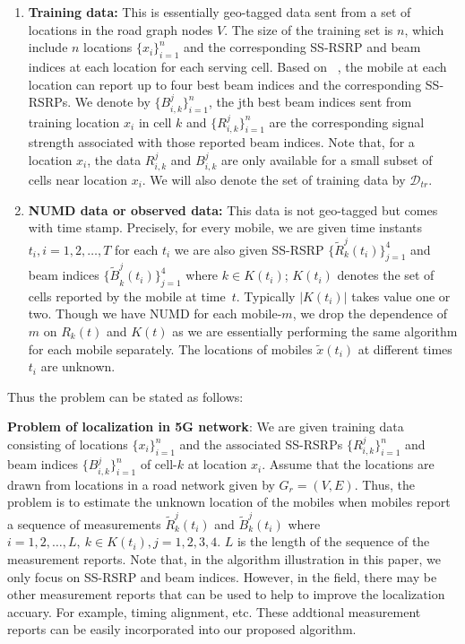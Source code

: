 \documentclass[conference, 10pt]{IEEEtran}
\newcommand{\abs}[1]{\lvert #1 \rvert}
\newcommand{\card}[1]{\abs{#1}}
\begin{document}
\begin{enumerate}

\item \textbf{Training data:} This is essentially geo-tagged data sent from
a set of locations in the road graph nodes $V$. The size of the training set is $n$, which include $n$ locations
$\{x_i\}_{i=1}^n$ and the corresponding SS-RSRP and beam indices at each location for each serving cell. Based on ~\cite{5GTF}, 
the mobile at each location can report up to four best beam indices and the corresponding SS-RSRPs.
We denote by $\{B^{j}_{i,k}\}_{i=1}^n$, the jth best beam indices sent from training location $x_i$ in cell $k$ and $\{R^j_{i,k}\}_{i=1}^n$ are the corresponding signal strength 
associated with those reported beam indices. Note
that, for a location $x_i$, the data $R^j_{i,k}$  and $B^j_{i,k}$ are only available
for a small subset of cells near location $x_i$. We will also denote the set of
training data by $\mathcal{D}_{tr}$.

\item \textbf{NUMD data or observed data:} This data is not geo-tagged but comes
with time stamp. Precisely, for every mobile, we are given time instants
$t_i, i=1,2,\hdots,T$ for each $t_i$ we are also given SS-RSRP
$\{{\tilde{R}}^j_k(t_i)\}_{j=1}^4$ and beam indices ${\{\tilde{B}}^j_k(t_i)\}_{j=1}^4$ where $k\in K(t_i)$; $K(t_i)$ denotes the set of cells reported by
the mobile at time~$t$. Typically $\card{K(t_i)}$ takes value one or two.
Though we have NUMD for each mobile-$m$, we drop the dependence of $m$
on $R_k(t)$ and $K(t)$ as we are essentially performing the same algorithm
for each mobile separately. The locations of mobiles $\tilde{x}(t_i)$ at different
times $t_i$ are unknown.
	
\end{enumerate} 

Thus the problem can be stated as follows:

{\bf Problem of localization in 5G network}: 
We are given training data consisting
of locations $\{x_i\}_{i=1}^n$ and the associated SS-RSRPs  $\{R^j_{i,k}\}_{i=1}^n$ and beam indices $\{B^j_{i,k}\}_{i=1}^n$ of
cell-$k$ at location $x_i$. Assume that the locations
are drawn from locations in a road network given by $G_r=(V,E)$. Thus, the problem is to estimate the unknown location of the mobiles when mobiles report a sequence of measurements
${\tilde{R}}^j_k(t_i)$ and ${\tilde{B}}^j_k(t_i)$ where $i=1,2,\hdots,L,\ k\in K(t_i), j=1, 2, 3, 4$. $L$ is the length of the sequence of the measurement reports.
Note that, in the algorithm illustration in this paper, we only focus on SS-RSRP and beam indices. However, in the field, there may be other measurement reports that 
can be used to help to improve the localization accuary. For example, timing alignment, etc. These addtional measurement reports can be easily incorporated into our proposed algorithm.
\end{document}
